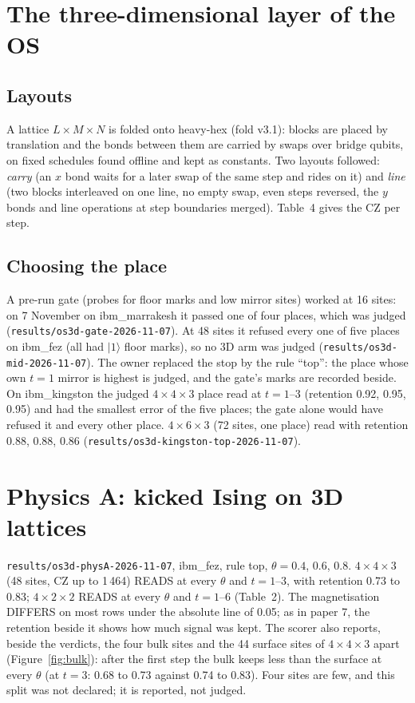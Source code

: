 \documentclass[10pt,a4paper]{article}
\begin{document}
\section{The three-dimensional layer of the OS}\label{sec:os3d}
\subsection{Layouts}
A lattice $L\times M\times N$ is folded onto heavy-hex (fold v3.1): blocks are placed by translation and the bonds
between them are carried by swaps over bridge qubits, on fixed schedules found offline and kept as constants. Two
layouts followed: \emph{carry} (an $x$ bond waits for a later swap of the same step and rides on it) and \emph{line}
(two blocks interleaved on one line, no empty swap, even steps reversed, the $y$ bonds and line operations at step
boundaries merged). Table~4 gives the CZ per step.

\subsection{Choosing the place}
A pre-run gate (probes for floor marks and low mirror sites) worked at 16 sites: on 7 November on ibm\_marrakesh it
passed one of four places, which was judged (\texttt{results/os3d-gate-2026-11-07}). At 48 sites it refused every one
of five places on ibm\_fez (all had $|1\rangle$ floor marks), so no 3D arm was judged
(\texttt{results/os3d-mid-2026-11-07}). The owner replaced the stop by the rule ``top'': the place whose own $t = 1$
mirror is highest is judged, and the gate's marks are recorded beside. On ibm\_kingston the judged $4\times4\times3$
place read at $t = 1$--3 (retention 0.92, 0.95, 0.95) and had the smallest error of the five places; the gate alone
would have refused it and every other place. $4\times6\times3$ (72 sites, one place) read with retention 0.88, 0.88,
0.86 (\texttt{results/os3d-kingston-top-2026-11-07}).

\section{Physics A: kicked Ising on 3D lattices}\label{sec:physA}
\texttt{results/os3d-physA-2026-11-07}, ibm\_fez, rule top, $\theta = 0.4$, 0.6, 0.8. $4\times4\times3$ (48 sites,
CZ up to 1\,464) READS at every $\theta$ and $t = 1$--3, with retention 0.73 to 0.83; $4\times2\times2$ READS at
every $\theta$ and $t = 1$--6 (Table~2). The magnetisation DIFFERS on most rows under the absolute line of 0.05; as
in paper 7, the retention beside it shows how much signal was kept. The scorer also reports, beside the verdicts,
the four bulk sites and the 44 surface sites of $4\times4\times3$ apart (Figure~\ref{fig:bulk}): after the first step
the bulk keeps less than the surface at every $\theta$ (at $t = 3$: 0.68 to 0.73 against 0.74 to 0.83). Four sites are
few, and this split was not declared; it is reported, not judged.
\end{document}
